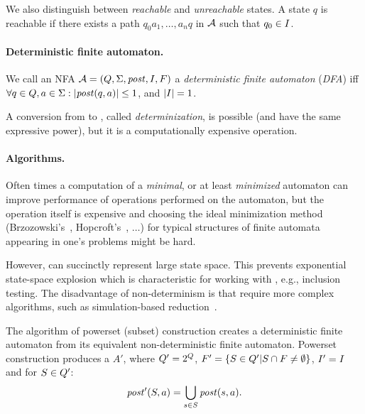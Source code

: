 We also distinguish between \emph{reachable} and \emph{unreachable} states.
A state $q$ is reachable if there exists a path $q_0a_1, \ldots, a_nq$ in $\mathcal{A}$ such that $q_0 \in I$.


\paragraph{Deterministic finite automaton.}
We call an NFA $\mathcal{A} = (Q, \Sigma
, \mathit{post}, I, F)$ a \emph{deterministic finite automaton} (\emph{DFA}) iff
\\$\forall q \in Q, a \in \Sigma: |\mathit{post}(q, a)| \leq 1
$, and $|I| = 1$.

A conversion from \nfa to \dfa, called \emph{determinization}, is possible (\nfas and \dfas have the same expressive power), but it is a computationally expensive operation.

\paragraph{Algorithms.}

Often times a computation of a \emph{minimal}, or at least \emph{minimized} automaton can improve performance of operations performed on the automaton, but the operation itself is expensive and choosing the ideal minimization method (Brzozowski's~\cite{Brzozowski1962CanonicalRE}, Hopcroft's~\cite{hopcroft_71}, $\ldots$) for typical structures of finite automata appearing in one's problems might be hard.

However, \nfas can succinctly represent large state space.
This prevents exponential state-space explosion which is characteristic for working with \dfas, e.g., inclusion testing.
The disadvantage of non-determinism is that \nfas require more complex algorithms, such as simulation-based reduction~\cite{ranzato_efficient_2010, holik_optimizing_2009, HHK95}.

\begin{definition} \hfill \newline
    The algorithm of powerset (subset) construction creates a deterministic finite automaton from its equivalent non-deterministic finite automaton. Powerset construction produces a \dfa $A'$, where $Q' = 2^Q$, $F' = \{S \in Q' | S \cap F \neq \emptyset\}$, $I' = I$ and for
    $S \in Q'$:
    $$\mathit{post}'(S, a) = \bigcup_{s \in S} \mathit{post}(s, a)\text{.}$$
\end{definition}

